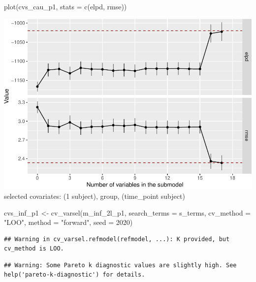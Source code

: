 \documentclass[
]{article}
\newenvironment{Shaded}{\begin{snugshade}}{\end{snugshade}}
\newcommand{\AttributeTok}[1]{\textcolor[rgb]{0.77,0.63,0.00}{#1}}
\newcommand{\DecValTok}[1]{\textcolor[rgb]{0.00,0.00,0.81}{#1}}
\newcommand{\FunctionTok}[1]{\textcolor[rgb]{0.00,0.00,0.00}{#1}}
\newcommand{\NormalTok}[1]{#1}
\newcommand{\OtherTok}[1]{\textcolor[rgb]{0.56,0.35,0.01}{#1}}
\newcommand{\StringTok}[1]{\textcolor[rgb]{0.31,0.60,0.02}{#1}}
\begin{document}
\begin{Shaded}
\begin{Highlighting}[]
\FunctionTok{plot}\NormalTok{(cvs\_cau\_p1, }\AttributeTok{stats =} \FunctionTok{c}\NormalTok{(}\StringTok{\textquotesingle{}elpd\textquotesingle{}}\NormalTok{, }\StringTok{\textquotesingle{}rmse\textquotesingle{}}\NormalTok{))}
\end{Highlighting}
\end{Shaded}

\includegraphics{PPI_analysis_final_files/figure-latex/unnamed-chunk-13-1.pdf}
selected covariates: (1 \textbar{} subject), group, (time\_point \textbar{} subject)

\begin{Shaded}
\begin{Highlighting}[]
\NormalTok{cvs\_inf\_p1 }\OtherTok{\textless{}{-}} \FunctionTok{cv\_varsel}\NormalTok{(m\_inf\_2l\_p1, }
                        \AttributeTok{search\_terms =}\NormalTok{ s\_terms, }
                        \AttributeTok{cv\_method =} \StringTok{"LOO"}\NormalTok{, }\AttributeTok{method =} \StringTok{"forward"}\NormalTok{,}
                        \AttributeTok{seed =} \DecValTok{2020}\NormalTok{)}
\end{Highlighting}
\end{Shaded}

\begin{verbatim}
## Warning in cv_varsel.refmodel(refmodel, ...): K provided, but cv_method is LOO.
\end{verbatim}

\begin{verbatim}
## Warning: Some Pareto k diagnostic values are slightly high. See help('pareto-k-diagnostic') for details.
\end{verbatim}
\end{document}
